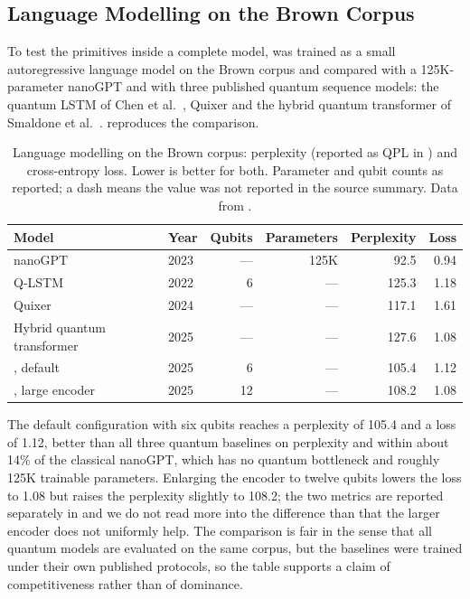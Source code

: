 \subsection{Language Modelling on the Brown Corpus}\label{sec:qml:vqt:lm}

To test the primitives inside a complete model, \vqt{} was trained as a small autoregressive language model on the Brown corpus \cite{francis1979brown} and compared with a 125K-parameter nanoGPT \cite{karpathy2023nanogpt} and with three published quantum sequence models: the quantum LSTM of Chen et al.~\cite{chen2022qlstm}, Quixer \cite{khatri2024quixer} and the hybrid quantum transformer of Smaldone et al.~\cite{smaldone2025hybridqt}.  reproduces the comparison.

\begin{table}[htbp]
\caption{Language modelling on the Brown corpus: perplexity (reported as QPL in \cite{guo2025vqt}) and cross-entropy loss. Lower is better for both. Parameter and qubit counts as reported; a dash means the value was not reported in the source summary. Data from \cite{guo2025vqt}.}\label{tab:qml:vqt-lm}
\centering
\small
\begin{tabular}{@{}llrrrr@{}}
\toprule
Model & Year & Qubits & Parameters & Perplexity & Loss \\
\midrule
nanoGPT \cite{karpathy2023nanogpt} & 2023 & --- & 125K & 92.5 & 0.94 \\
Q-LSTM \cite{chen2022qlstm} & 2022 & 6 & --- & 125.3 & 1.18 \\
Quixer \cite{khatri2024quixer} & 2024 & --- & --- & 117.1 & 1.61 \\
Hybrid quantum transformer & 2025 & --- & --- & 127.6 & 1.08 \\
\vqt{}, default & 2025 & 6 & --- & 105.4 & 1.12 \\
\vqt{}, large encoder & 2025 & 12 & --- & 108.2 & 1.08 \\
\bottomrule
\end{tabular}
\end{table}

The default \vqt{} configuration with six qubits reaches a perplexity of 105.4 and a loss of 1.12, better than all three quantum baselines on perplexity and within about 14\% of the classical nanoGPT, which has no quantum bottleneck and roughly 125K trainable parameters. Enlarging the encoder to twelve qubits lowers the loss to 1.08 but raises the perplexity slightly to 108.2; the two metrics are reported separately in \cite{guo2025vqt} and we do not read more into the difference than that the larger encoder does not uniformly help. The comparison is fair in the sense that all quantum models are evaluated on the same corpus, but the baselines were trained under their own published protocols, so the table supports a claim of competitiveness rather than of dominance.

